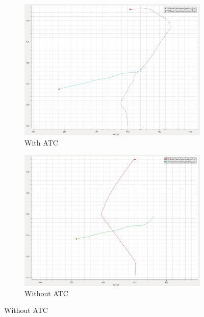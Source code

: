          \begin{figure}[H]
        \centering
        
            \begin{subfigure}[b]{0.45\textwidth}
                \centering
                \includegraphics[width=\textwidth]{figs/plot_crossingRight_E.png}
                \caption{With \ac{ATC}}
                \label{fig:plot_crossingRight_E}
            \end{subfigure}
            \begin{subfigure}[b]{0.45\textwidth}
                \centering
                \includegraphics[width=\textwidth]{figs/plot_noATC_crossingRight_E.png}
                \caption{Without \ac{ATC}}
                \label{fig:plot_noATC_crossingRight_E}
            \end{subfigure}
            

\end{figure}
